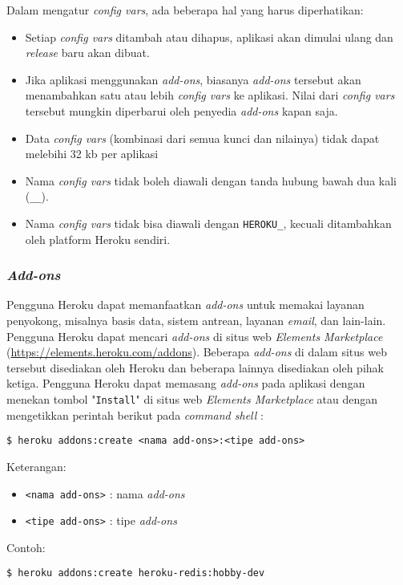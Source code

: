 Dalam mengatur \textit{config vars}, ada beberapa hal yang harus diperhatikan:
\begin{itemize}
\item Setiap \textit{config vars} ditambah atau dihapus, aplikasi akan dimulai ulang dan \textit{release} baru akan dibuat.
\item Jika aplikasi menggunakan \textit{add-ons}, biasanya \textit{add-ons} tersebut akan menambahkan satu atau lebih \textit{config vars} ke aplikasi. Nilai dari \textit{config vars} tersebut mungkin diperbarui oleh penyedia \textit{add-ons} kapan saja.
\item Data \textit{config vars} (kombinasi dari semua kunci dan nilainya) tidak dapat melebihi 32 kb per aplikasi
\item Nama \textit{config vars} tidak boleh diawali dengan tanda hubung bawah dua kali (\texttt{\_\_}).
\item Nama \textit{config vars} tidak bisa diawali dengan \texttt{HEROKU\_}, kecuali ditambahkan oleh platform Heroku sendiri.
\end{itemize}

\subsubsection{\textit{Add-ons}}
Pengguna Heroku dapat memanfaatkan \textit{add-ons} untuk memakai layanan penyokong, misalnya basis data, sistem antrean, layanan \textit{email}, dan lain-lain. Pengguna Heroku dapat mencari \textit{add-ons} di situs web \textit{Elements Marketplace} (\url{https://elements.heroku.com/addons}). Beberapa \textit{add-ons} di dalam situs web tersebut disediakan oleh Heroku dan beberapa lainnya disediakan oleh pihak ketiga. Pengguna Heroku dapat memasang \textit{add-ons} pada aplikasi dengan menekan tombol "\texttt{Install}" di situs web \textit{Elements Marketplace} atau dengan mengetikkan perintah berikut pada \textit{command shell} :
\begin{lstlisting}
$ heroku addons:create <nama add-ons>:<tipe add-ons>
\end{lstlisting}
Keterangan:
\begin{itemize}
\item \texttt{<nama add-ons>} : nama \textit{add-ons}
\item \texttt{<tipe add-ons>} : tipe \textit{add-ons}
\end{itemize}
Contoh:
\begin{lstlisting}
$ heroku addons:create heroku-redis:hobby-dev
\end{lstlisting}

